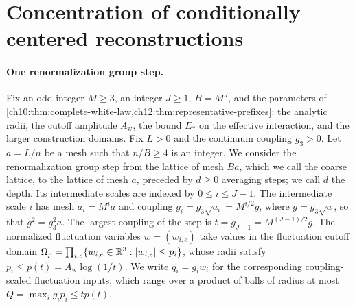 \section{Concentration of conditionally centered reconstructions}\label{ch13:sec:concentration}

\paragraph{One renormalization group step.}
Fix an odd integer $M\ge3$, an integer $J\ge1$, $B=M^J$, and the parameters of \cref{ch10:thm:complete-white-law,ch12:thm:representative-prefixes}: the analytic radii, the cutoff amplitude $A_{\mathrm w}$, the bound $E_*$ on the effective interaction, and the larger construction domains. Fix $L>0$ and the continuum coupling $g_3>0$. Let $a=L/n$ be a mesh such that $n/B\ge4$ is an integer. We consider the renormalization group step from the lattice of mesh $Ba$, which we call the coarse lattice, to the lattice of mesh $a$, preceded by $d\ge0$ averaging steps; we call $d$ the depth. Its intermediate scales are indexed by $0\le i\le J-1$. The intermediate scale $i$ has mesh $a_i=M^ia$ and coupling $g_i=g_3\sqrt{a_i}=M^{i/2}g$, where $g=g_3\sqrt a$, so that $g^2=g_3^2a$. The largest coupling of the step is $t=g_{J-1}=M^{(J-1)/2}g$. The normalized fluctuation variables $w=(w_{i,e})$ take values in the fluctuation cutoff domain $\Omega_p=\prod_{i,e}\{w_{i,e}\in\mathbb R^3:\lvert w_{i,e}\rvert\le p_i\}$, whose radii satisfy $p_i\le p(t)=A_{\mathrm w}\log(1/t)$. We write $q_i=g_iw_i$ for the corresponding coupling-scaled fluctuation inputs, which range over a product of balls of radius at most $Q=\max_ig_ip_i\le tp(t)$.

